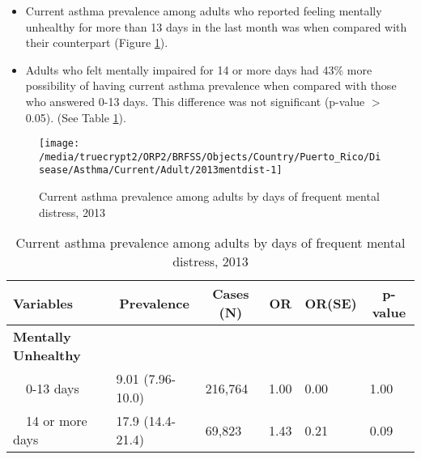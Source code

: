  \newpage
\begin{itemize}

\item Current asthma prevalence among adults who reported feeling mentally unhealthy for more than 13 days in the last month was  when compared with their counterpart (Figure \ref{fig:mental.Asthma.2013}).


\item  Adults who felt mentally impaired for 14 or more days had 43\% more possibility of having current asthma prevalence when compared with those who answered 0-13 days. This difference was not significant (p-value $>$ 0.05). (See Table \ref{tab:mental.Asthma.2013}).

\end{itemize}

\begin{figure}[H]
\centering
\caption{Current asthma prevalence among adults by days of frequent mental distress, 2013}
\label{fig:mental.Asthma.2013}

\begin{knitrout}
\color{fgcolor}

{\centering \texttt{[image: /media/truecrypt2/ORP2/BRFSS/Objects/Country/Puerto\_Rico/Disease/Asthma/Current/Adult/2013mentdist-1]} 

}



\end{knitrout}
 \end{figure}

\begin{table}[H]
\caption{Current asthma prevalence among adults by days of frequent mental distress, 2013\label{tab:mental.Asthma.2013}} 
\begin{center}
\begin{tabular}{llllll}
\hline\hline
\multicolumn{1}{l}{Variables}&\multicolumn{1}{c}{Prevalence}&\multicolumn{1}{c}{Cases (N)}&\multicolumn{1}{c}{OR}&\multicolumn{1}{c}{OR(SE)}&\multicolumn{1}{c}{p-value}\tabularnewline
\hline
{\bfseries Mentally Unhealthy}&&&&&\tabularnewline
~~0-13 days&9.01 (7.96-10.0)&216,764&1.00&0.00&1.00\tabularnewline
~~14 or more days&17.9 (14.4-21.4)& 69,823&1.43&0.21&0.09\tabularnewline
\hline
\end{tabular}\end{center}

\end{table}




